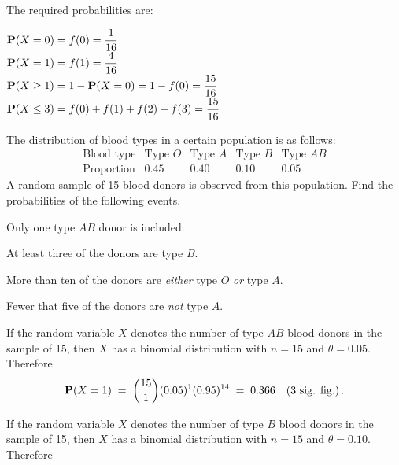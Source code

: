 \begin{ExerciseList}
\item The required probabilities are:

$\displaystyle \mathbf{P}(X=0)=f(0)=\frac{1}{16}$\\[3pt]
$\displaystyle \mathbf{P}(X=1)=f(1)=\frac{4}{16}$\\[3pt]
$\displaystyle \mathbf{P}(X\geq1)=1-\mathbf{P}(X=0)=1-f(0)=\frac{15}{16}$\\[3pt]
$\displaystyle \mathbf{P}(X\leq3)=f(0)+f(1)+f(2)+f(3)=\frac{15}{16}$
\ee

\Exercise
The distribution of blood types in a certain  population is as follows:
$$
\begin{array}{c|cccc}
\text{Blood type}&\text{Type } O&\text{Type } A&\text{Type } B& \text{Type }AB\\\hline
\text{Proportion}&0.45&0.40&0.10&0.05
\end{array}
$$
A random sample of 15 blood donors is observed from this
population. Find the probabilities of the following events.

\be
\item Only one type $AB$ donor is included.
\item At least three of the donors are type $B$.
\item More than ten of the donors are \emph{either} type $O$ \emph{or} type $A$.
\item Fewer that five of the donors are \emph{not} type $A$.
\ee
\Answer
\be
\item  If the random variable $X$ denotes the number of type $AB$ blood donors
  in the sample of 15, then $X$ has a binomial distribution with $n=15$
  and $\theta=0.05$.  Therefore
\[\mathbf{P}(X=1) \;=\;\binom{15}{1} (0.05)^1  (0.95)^{14}\;=\;0.366 \quad (\text{3 sig. fig.}) \,.\]

\medskip
\item  If the random variable $X$ denotes the number of type $B$  blood donors
  in the sample of 15, then $X$ has a binomial distribution with $n=15$
  and $\theta=0.10$.  Therefore


\end{ExerciseList}
